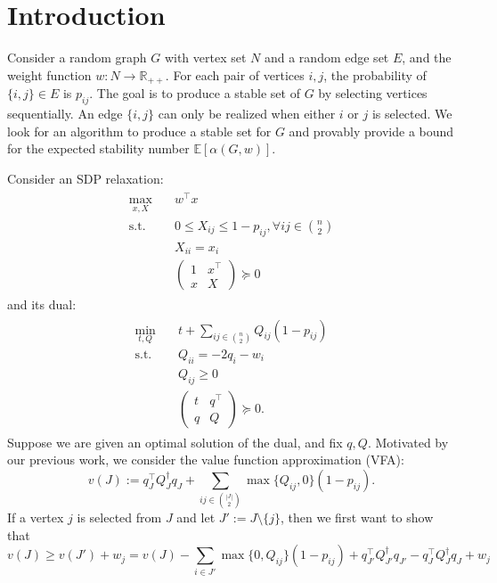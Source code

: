 \documentclass[10pt,leqno]{amsart}
\newcommand{\R}{\mathbb{R}}
\newcommand{\E}{\mathbb{E}}
\begin{document}
\section{Introduction}
Consider a random graph $G$ with vertex set $N$ and a random edge set $E$, and the weight function $w:N\to \R_{++}$.
For each pair of vertices $i,j$, the probability of $\{i,j\}\in E$ is $p_{ij}$.
The goal is to produce a stable set of $G$ by selecting vertices sequentially.
An edge $\{i,j\}$ can only be realized when either $i$ or $j$ is selected.
We look for an algorithm to produce a stable set for $G$ and provably provide a bound for the expected stability number $\E[\alpha(G,w)]$.

Consider an SDP relaxation:
\begin{align}
  \label{SDP-P}
  \tag{SDP-P}
  \begin{split}
    \max_{x,X}\quad &w^\top x\\
    \text{s.t.}\quad &0\leq X_{ij}\leq 1-p_{ij},\forall ij\in{n\choose{2}}\\
    &X_{ii}=x_i\\
    &
    \begin{pmatrix}
      1&x^\top\\
      x&X
    \end{pmatrix}\succeq 0
  \end{split}
\end{align}
and its dual:
\begin{align}
  \label{SDP-D}
  \tag{SDP-D}
  \begin{split}
    \min_{t,Q}\quad &t+\sum_{ij\in{n\choose{2}}}Q_{ij}(1-p_{ij})\\
    \text{s.t.}\quad &
    Q_{ii}=-2q_i-w_i\\
    &Q_{ij}\geq 0\\
    &
    \begin{pmatrix}
      t&q^\top\\
      q&Q
    \end{pmatrix}\succeq 0.
  \end{split}
\end{align}
Suppose we are given an optimal solution of the dual, and fix $q,Q$.
Motivated by our previous work, we consider the value function approximation (VFA):
\[v(J):=q_{J}^\top Q^\dagger_{J}q_{J}+\sum_{ij\in{|J|\choose{2}}}\max\{Q_{ij},0\}(1-p_{ij}).\]
If a vertex $j$ is selected from $J$ and let $J':=J\setminus\{j\}$, then we first want to show that
\[v(J)\geq v(J')+w_j=v(J)-\sum_{i\in J'}\max\{0,Q_{ij}\}(1-p_{ij})+q_{J'}^\top Q_{J'}^\dagger q_{J'}-q_J^\top Q_J^\dagger q_J+w_j\]
\end{document}
